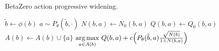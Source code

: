 \begin{algorithm}[H]
    \small
    \caption{BetaZero action progressive widening.}
    \label{alg:betazero-action-pw}
    \begin{algorithmic}[1]
            \State $\tilde{b} \leftarrow \phi(b)$ 
             
                \State $a \sim P_\theta(\tilde{b}, \cdot)$ 
                \State $N(b,a) \leftarrow N_0(b,a)$
                \State $Q(b,a) \leftarrow Q_0(b,a)$ \label{line:init_q} 
                \State $A(b) \leftarrow A(b) \cup \{a\}$ 
            \EndIf
            \State \Return ${\displaystyle\operatorname*{arg\,max}_{a \in A(b)}}\ Q(b,a) + c\Bigl(P_\theta(\tilde{b},a)\frac{\sqrt{N(b)}}{1 + N(b,a)}\Bigr)$ 
        \EndFunction
    \end{algorithmic}
\end{algorithm}
